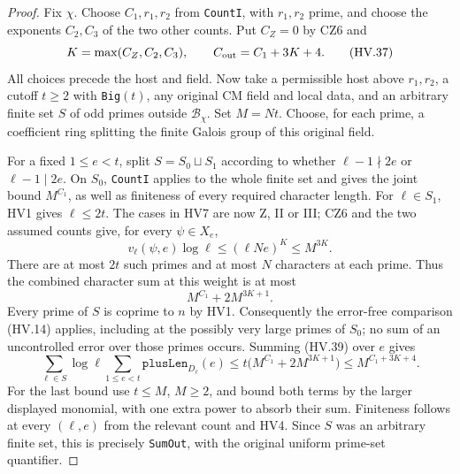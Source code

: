\begin{proof}
Fix $\chi$.  Choose $C_1,r_1,r_2$ from \texttt{CountI},
with $r_1,r_2$ prime, and choose the exponents $C_2,C_3$ of
the two other counts.  Put $C_Z=0$ by CZ6 and
\[
       K=\max(C_Z,C_2,C_3),\qquad
       C_{\rm out}=C_1+3K+4.
 \tag{HV.37}
\]
All choices precede the host and field.
Now take a permissible host above $r_1,r_2$, a cutoff $t\ge2$
with \texttt{Big}$(t)$, any original CM field and local data,
and an arbitrary finite set $S$ of odd primes outside
$\mathcal B_\chi$.  Set $M=Nt$.
Choose, for each prime, a coefficient ring splitting the
finite Galois group of this original field.

For a fixed $1\le e<t$, split $S=S_0\sqcup S_1$ according
to whether $\ell-1\nmid2e$ or $\ell-1\mid2e$.
On $S_0$, \texttt{CountI} applies to the whole finite set
and gives the joint bound $M^{C_1}$, as well as finiteness
of every required character length.
For $\ell\in S_1$, HV1 gives $\ell\le2t$.
The cases in HV7 are now Z, II or III; CZ6 and the two
assumed counts give, for every $\psi\in X_e$,
\[
                 v_\ell(\psi,e)\log\ell
                        \le(\ell Ne)^K\le M^{3K}.
 \tag{HV.38}
\]
There are at most $2t$ such primes and at most $N$ characters
at each prime.  Thus the combined character sum at this
weight is at most
\[
                         M^{C_1}+2M^{3K+1}.
 \tag{HV.39}
\]
Every prime of $S$ is coprime to $n$ by HV1.  Consequently
the error-free comparison (HV.14) applies, including at the
possibly very large primes of $S_0$; no sum of an uncontrolled
error over those primes occurs.
Summing (HV.39) over $e$ gives
\[
 \sum_{\ell\in S}\log\ell\sum_{1\le e<t}
                         \mathtt{plusLen}_{D_\ell}(e)
 \le t\bigl(M^{C_1}+2M^{3K+1}\bigr)
 \le M^{C_1+3K+4}.
 \tag{HV.40}
\]
For the last bound use $t\le M$, $M\ge2$, and bound both
terms by the larger displayed monomial, with one extra
power to absorb their sum.
Finiteness follows at every $(\ell,e)$ from the relevant
count and HV4.  Since $S$ was an arbitrary finite set, this
is precisely \texttt{SumOut}, with the original uniform
prime-set quantifier.
\end{proof}

